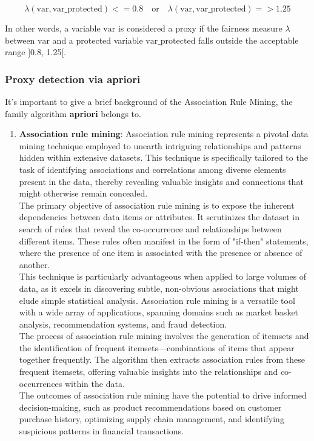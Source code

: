\documentclass[12pt,a4paper,openright,twoside]{book}
\begin{document}
\[
\lambda(\text{var}, \text{var\_protected}) <= 0.8 \quad \text{or} \quad \lambda(\text{var}, \text{var\_protected}) => 1.25
\]

In other words, a variable \( \text{var} \) is considered a proxy if the fairness measure \( \lambda \) between \( \text{var} \) and a protected variable \( \text{var\_protected} \) falls outside the acceptable range ]0.8, 1.25[. \\

\subsubsection{Proxy detection via apriori}
It's important to give a brief background of the Association Rule Mining, the family algorithm \textbf{apriori} belongs to.

\begin{enumerate}
    \item \textbf{Association rule mining}:
    Association rule mining represents a pivotal data mining technique employed to unearth intriguing relationships and patterns hidden within extensive datasets. This technique is specifically tailored to the task of identifying associations and correlations among diverse elements present in the data, thereby revealing valuable insights and connections that might otherwise remain concealed. \\
    The primary objective of association rule mining is to expose the inherent dependencies between data items or attributes. It scrutinizes the dataset in search of rules that reveal the co-occurrence and relationships between different items. These rules often manifest in the form of "if-then" statements, where the presence of one item is associated with the presence or absence of another. \\
    This technique is particularly advantageous when applied to large volumes of data, as it excels in discovering subtle, non-obvious associations that might elude simple statistical analysis. Association rule mining is a versatile tool with a wide array of applications, spanning domains such as market basket analysis, recommendation systems, and fraud detection. \\
    The process of association rule mining involves the generation of itemsets and the identification of frequent itemsets—combinations of items that appear together frequently. The algorithm then extracts association rules from these frequent itemsets, offering valuable insights into the relationships and co-occurrences within the data. \\
    The outcomes of association rule mining have the potential to drive informed decision-making, such as product recommendations based on customer purchase history, optimizing supply chain management, and identifying suspicious patterns in financial transactions.
    


\end{enumerate}
\end{document}
